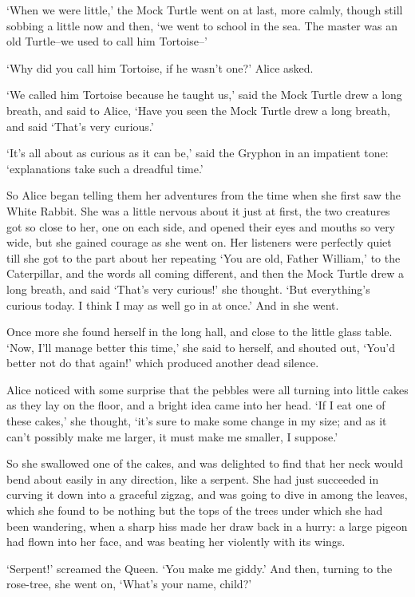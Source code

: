 \documentclass[statementpaper,twoside,openany]{memoir}
\begin{document}
`When we were little,' the Mock Turtle went on at last, more calmly, though still sobbing a little now and then, `we went to school in the sea. The master was an old Turtle--we used to call him Tortoise--'

`Why did you call him Tortoise, if he wasn't one?' Alice asked.

`We called him Tortoise because he taught us,' said the Mock Turtle drew a long breath, and said to Alice, `Have you seen the Mock Turtle drew a long breath, and said `That's very curious.'

`It's all about as curious as it can be,' said the Gryphon in an impatient tone: `explanations take such a dreadful time.'

So Alice began telling them her adventures from the time when she first saw the White Rabbit. She was a little nervous about it just at first, the two creatures got so close to her, one on each side, and opened their eyes and mouths so very wide, but she gained courage as she went on. Her listeners were perfectly quiet till she got to the part about her repeating `You are old, Father William,' to the Caterpillar, and the words all coming different, and then the Mock Turtle drew a long breath, and said `That's very curious!' she thought. `But everything's curious today. I think I may as well go in at once.' And in she went.

Once more she found herself in the long hall, and close to the little glass table. `Now, I'll manage better this time,' she said to herself, and shouted out, `You'd better not do that again!' which produced another dead silence.

Alice noticed with some surprise that the pebbles were all turning into little cakes as they lay on the floor, and a bright idea came into her head. `If I eat one of these cakes,' she thought, `it's sure to make some change in my size; and as it can't possibly make me larger, it must make me smaller, I suppose.'

So she swallowed one of the cakes, and was delighted to find that her neck would bend about easily in any direction, like a serpent. She had just succeeded in curving it down into a graceful zigzag, and was going to dive in among the leaves, which she found to be nothing but the tops of the trees under which she had been wandering, when a sharp hiss made her draw back in a hurry: a large pigeon had flown into her face, and was beating her violently with its wings.

`Serpent!' screamed the Queen. `You make me giddy.' And then, turning to the rose-tree, she went on, `What's your name, child?'
\end{document}

